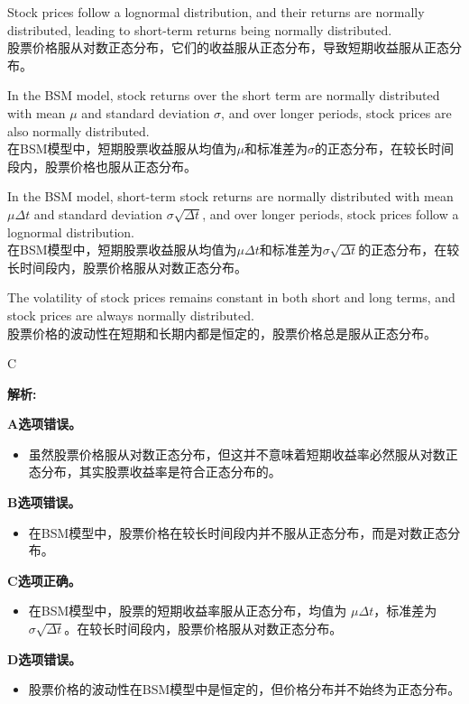 \documentclass{article}
\newenvironment{explanation}
{\textbf{解析:}\par}
{\par}
\begin{document}
    \begin{choices}
    \item Stock prices follow a lognormal distribution, and their returns are normally distributed, leading to short-term returns being normally distributed.\\
    股票价格服从对数正态分布，它们的收益服从正态分布，导致短期收益服从正态分布。
    \item In the BSM model, stock returns over the short term are normally distributed with mean \(\mu\) and standard deviation \(\sigma\), and over longer periods, stock prices are also normally distributed.\\
    在BSM模型中，短期股票收益服从均值为\(\mu\)和标准差为\(\sigma\)的正态分布，在较长时间段内，股票价格也服从正态分布。
    \item In the BSM model, short-term stock returns are normally distributed with mean \(\mu \Delta t\) and standard deviation \(\sigma \sqrt{\Delta t}\), and over longer periods, stock prices follow a lognormal distribution.\\
    在BSM模型中，短期股票收益服从均值为\(\mu \Delta t\)和标准差为\(\sigma \sqrt{\Delta t}\)的正态分布，在较长时间段内，股票价格服从对数正态分布。
    \item The volatility of stock prices remains constant in both short and long terms, and stock prices are always normally distributed.\\
    股票价格的波动性在短期和长期内都是恒定的，股票价格总是服从正态分布。
    \end{choices}
    
    \begin{correctanswer}
    C
    \end{correctanswer}
    
    \begin{explanation}
   
    \textbf{A选项错误。}
    \begin{itemize}
    \item 虽然股票价格服从对数正态分布，但这并不意味着短期收益率必然服从对数正态分布，其实股票收益率是符合正态分布的。
    \end{itemize}
    
    \textbf{B选项错误。}
    \begin{itemize}
    \item 在BSM模型中，股票价格在较长时间段内并不服从正态分布，而是对数正态分布。
    \end{itemize}
    
    \textbf{C选项正确。}
    \begin{itemize}
    \item 在BSM模型中，股票的短期收益率服从正态分布，均值为 \(\mu \Delta t\)，标准差为 \(\sigma \sqrt{\Delta t}\)。在较长时间段内，股票价格服从对数正态分布。
    \end{itemize}


    \textbf{D选项错误。}
    \begin{itemize}
    \item 股票价格的波动性在BSM模型中是恒定的，但价格分布并不始终为正态分布。
    \end{itemize}
    \end{explanation}
\end{document}
